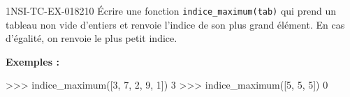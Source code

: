 \begin{exercice}{1NSI-TC-EX-018}{2}{10}
Écrire une fonction \lstinline{indice_maximum(tab)} qui prend un tableau non vide
d'entiers et renvoie l'indice de son plus grand élément. En cas d'égalité, on
renvoie le plus petit indice.

\textbf{Exemples :}
\begin{console}
>>> indice_maximum([3, 7, 2, 9, 1])
3
>>> indice_maximum([5, 5, 5])
0
\end{console}
\end{exercice}
